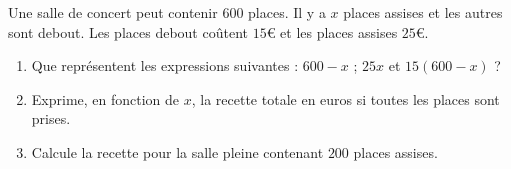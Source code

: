 
\begin{exercice}\label{exosmath-0808}

 Une salle de concert peut contenir $600$ places. Il y a $x$ places assises et les autres sont debout. Les places debout coûtent $15$€ et les places assises $25$€.
 \begin{enumerate}
     \item
 Que représentent les expressions suivantes : $600-x$ ; $25x$ et $15(600-x)$ ?
 \item
 Exprime, en fonction de $x$, la recette totale en euros si toutes les places sont prises.
\item
 Calcule la recette pour la salle pleine contenant \( 200\) places assises.
 \end{enumerate}

\end{exercice}
